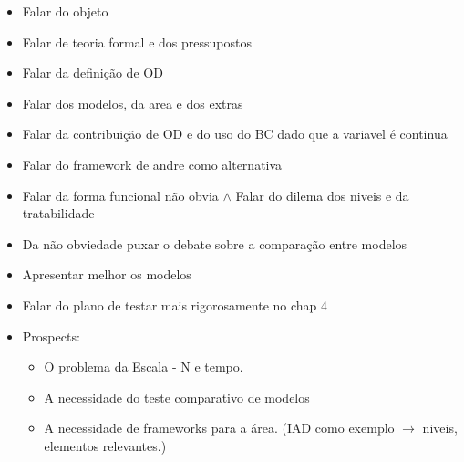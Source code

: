 \documentclass{article}
\begin{document}
\begin{itemize}
\item Falar do objeto
\item Falar de teoria formal e dos pressupostos
\item Falar da definição de OD
\item Falar dos modelos, da area e dos extras
\item Falar da contribuição de OD e do uso do BC dado que a variavel é continua
\item Falar do framework de andre como alternativa
\item Falar da forma funcional não obvia $\land$ Falar do dilema dos niveis e da
  tratabilidade
\item Da não obviedade puxar o debate sobre a comparação entre modelos
\item Apresentar melhor os modelos
\item Falar do plano de testar mais rigorosamente no chap 4 
\item Prospects:
  \begin{itemize}
  \item  O problema da Escala  - N e tempo.
  \item A necessidade do teste comparativo de modelos
  \item A necessidade de frameworks para a área. (IAD como exemplo $\rightarrow$ niveis,
    elementos relevantes.)
  \end{itemize}


\end{itemize}
\end{document}
